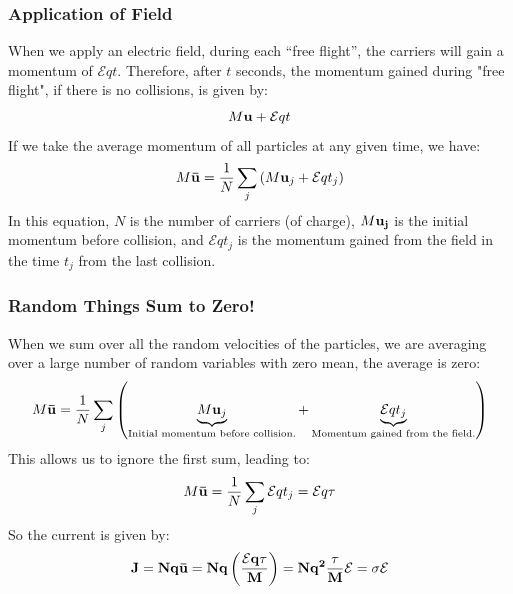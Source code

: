 \subsubsection{Application of Field}
When we apply an electric field, during each “free flight”, the carriers will gain a momentum of $ {\mathcal{E}}qt $.  Therefore, after $t$ seconds, the momentum gained during "free flight", if there is no collisions, is given by:
    \begin{equation}
        M{\bf{u}} + {\mathcal{E}}qt
    \end{equation}
If we take the average momentum of all particles at any given time, we have:
    \begin{equation}
        M{\bf{\bar u}} = \frac{1}{N}\sum\limits_j {\left( {M{{\bf{u}}_j} + {\mathcal{E}}q{t_j}} \right)}
    \end{equation}
In this equation, $N$ is the number of carriers (of charge), $ M \bf{u}_j $ is the initial momentum before collision, and $\mathcal{E}q{t_j}$ is the momentum gained from the field in the time $t_j$ from the last collision.
\subsubsection{Random Things Sum to Zero!}
When we sum over all the random velocities of the particles, we are averaging over a large number of random variables with zero mean, the average is zero:
    \begin{equation}
        M{\bf{\bar u}} = \frac{1}{N}\sum\limits_j {\left( \underbrace{M{{\bf{u}}_j}}_{\text{Initial momentum before collision.}} + \underbrace{ {\mathcal{E}q{t_j}} }_{\text{Momentum gained from the field.}} \right)}
    \end{equation}
This allows us to ignore the first sum, leading to:
    \begin{equation}
        M{\bf{\bar u}} = \frac{1}{N}\sum\limits_j {{\mathcal{E}}q{t_j}}  = {\mathcal{E}}q\tau
    \end{equation}
So the current is given by:
    \begin{equation}
        \bf{J} = Nq{\bf{\bar u}} = Nq\left( {\frac{{{\mathcal{E}}q\tau }}{M}} \right) = N{q^2}\frac{\tau }{M}{\mathcal{E}} = \sigma{\mathcal{E}}
    \end{equation}
